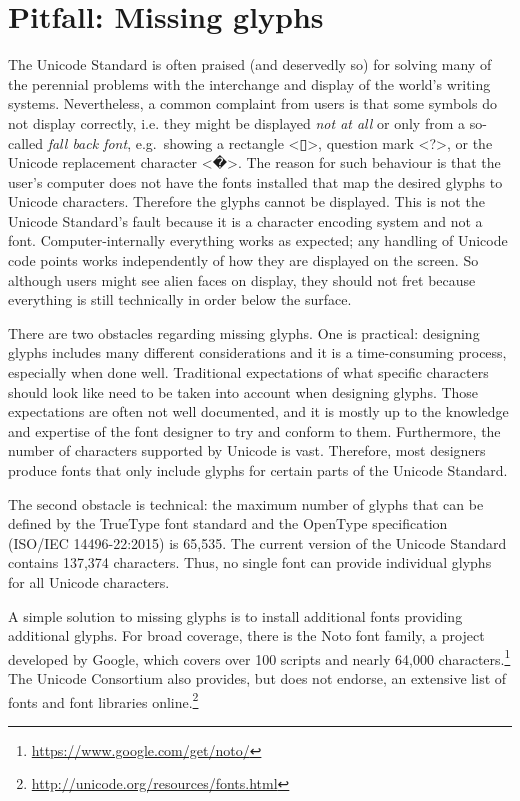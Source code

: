 \section{Pitfall: Missing glyphs}
\label{pitfall-missing-glyphs}

The Unicode Standard is often praised (and deservedly so) for solving many of
the perennial problems with the interchange and display of the world's writing
systems. Nevertheless, a common complaint from users is that some symbols do not display 
correctly, i.e. they might be displayed \textit{not at all} or only from a so-called 
\textit{fall back font}, e.g.\ showing a 
rectangle <▯>, question mark <?>, or the Unicode replacement character <�>. 
The reason for such behaviour is that the user's computer does not have the fonts 
installed that map the desired glyphs to Unicode characters. 
Therefore the glyphs cannot be displayed.
This is not the Unicode Standard's fault because it is a character 
encoding system and not a font. Computer-internally everything works as expected; 
any handling of Unicode code points works independently of how they 
are displayed on the screen. So although users might see
alien faces on display, they should not fret because everything is still 
technically in order below the surface.

There are two obstacles regarding missing glyphs. One is practical: 
designing glyphs includes many different considerations and 
it is a time-consuming process, especially when done well. 
Traditional expectations of what specific characters should look like need
to be taken into account when designing glyphs. Those expectations are often not
well documented, and it is mostly up to the knowledge and expertise of the font
designer to try and conform to them. Furthermore, the number of characters 
supported by Unicode is vast. Therefore, most designers 
produce fonts that only include glyphs for certain parts of the Unicode
Standard. 

The second obstacle is technical: the maximum number of glyphs that can be 
defined by the TrueType font standard and the OpenType specification 
(ISO/IEC 14496-22:2015) is 65,535. The current version of the Unicode Standard 
contains 137,374 characters. Thus, no single font can provide individual 
glyphs for all Unicode characters.

A simple solution to missing glyphs is to install additional fonts
providing additional glyphs. For broad coverage, there is the Noto font family, a project developed by Google, 
which covers over 100 scripts and nearly 64,000 characters.\footnote{\url{https://www.google.com/get/noto/}} 
The Unicode Consortium also provides, but does not endorse, an extensive list of fonts and font libraries online.\footnote{\url{http://unicode.org/resources/fonts.html}}

